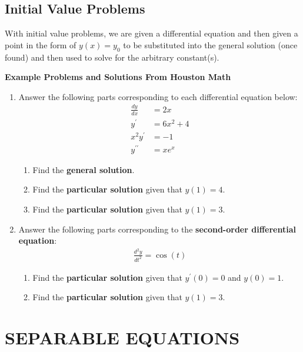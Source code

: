 \documentclass[11pt]{article}
\begin{document}
\subsection{Initial Value Problems}
With initial value problems, we are given a differential equation and then given a point in the form of $y(x)=y_0$ to be substituted into the general
solution (once found) and then used to solve for the arbitrary constant(s).

\textbf{Example Problems and Solutions From Houston Math}

\begin{enumerate}
  \item Answer the following parts corresponding to each differential equation below:
  \begin{align}
    \frac{dy}{dx} &= 2x \\
    y^{\prime} &= 6x^{2} + 4 \\
    x^{2}y^{\prime} &= -1 \\
    y^{\prime\prime} &= xe^{x}
  \end{align}

  \begin{enumerate}[topsep=2pt, itemsep=2pt, leftmargin=*]
    \item Find the \textbf{general solution}.
    \item Find the \textbf{particular solution} given that $y(1)=4$.
    \item Find the \textbf{particular solution} given that $y(1)=3$.
  \end{enumerate}

  \item Answer the following parts corresponding to the \textbf{second-order differential equation}:
  \begin{align}
    \frac{d^{2}y}{dt^{2}} = \cos(t)
  \end{align}

  \begin{enumerate}[topsep=2pt, itemsep=2pt, leftmargin=*]
    \item Find the \textbf{particular solution} given that $y^{\prime}(0) = 0$ and $y(0) = 1$.
    \item Find the \textbf{particular solution} given that $y(1)=3$.
  \end{enumerate}
\end{enumerate}

\newpage
\section{SEPARABLE EQUATIONS}
\end{document}
